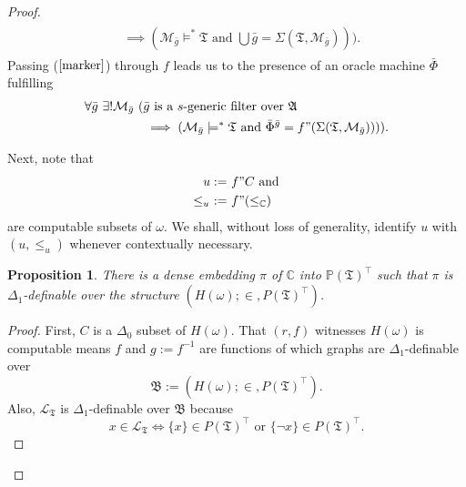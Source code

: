 \documentclass[12pt, twoside]{memoir}
\numberwithin{equation}{section}
\newtheorem{prop}[thm]{Proposition}
\theoremstyle{definition}
\theoremstyle{remark}
\theoremstyle{definition}
\theoremstyle{definition}
\theoremstyle{definition}
\theoremstyle{remark}
\begin{document}
\begin{proof}
\begin{align}
\begin{split}
    & \implies (\mathcal{M}_{\bar{g}} \models^* \mathfrak{T} \text{ and } \bigcup \bar{g} = \Sigma(\mathfrak{T}, \mathcal{M}_{\bar{g}}))) \text{.}
\end{split}
\end{align}
Passing ($\ref{marker}$) through $f$ leads us to the presence of an oracle machine $\bar{\Phi}$ fulfilling
\begin{align}\label{marker2}
\begin{split}
    \forall \bar{g} \ \exists ! \mathcal{M}_{\bar{g}} \ ( & \bar{g} \text{ is a } s \text{-generic filter over } \mathfrak{A} \\ 
    & \implies (\mathcal{M}_{\bar{g}} \models^* \mathfrak{T} \text{ and } \bar{\Phi}^{\bar{g}} = f" (\Sigma(\mathfrak{T}, \mathcal{M}_{\bar{g}})))) \text{.}
\end{split}
\end{align}

Next, note that 
\begin{align*}
    u := \ & f" C \text{ and} \\
    \leq_u \ := \ & f" (\leq_{\mathbb{C}})
\end{align*}
are computable subsets of $\omega$. We shall, without loss of generality, identify $u$ with $(u, \leq_u)$ whenever contextually necessary.

\begin{prop}\label{notlastp}
There is a dense embedding $\pi$ of $\mathbb{C}$ into $\mathbb{P}(\mathfrak{T})^{\top}$ such that $\pi$ is $\Delta_1$-definable over the structure $(H(\omega); \in, P(\mathfrak{T})^{\top})$.
\end{prop}

\begin{proof}
First, $C$ is a $\Delta_0$ subset of $H(\omega)$. That $(r, f)$ witnesses $H(\omega)$ is computable means $f$ and $g := f^{-1}$ are functions of which graphs are $\Delta_1$-definable over $$\mathfrak{B} := (H(\omega); \in, P(\mathfrak{T})^{\top}).$$ Also, $\mathcal{L}_{\mathfrak{T}}$ is $\Delta_1$-definable over $\mathfrak{B}$ because $$x \in \mathcal{L}_{\mathfrak{T}} \iff \{x\} \in P(\mathfrak{T})^{\top} \text{ or } \{\neg x\} \in P(\mathfrak{T})^{\top}.$$  


\end{proof}
\end{proof}
\end{document}
